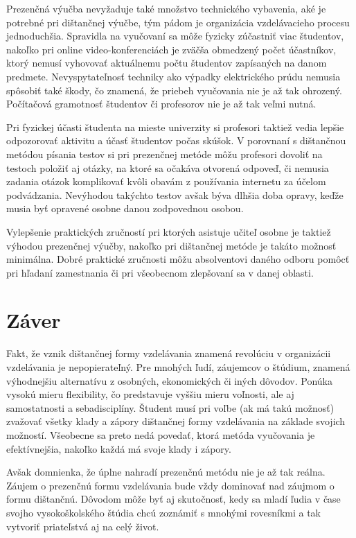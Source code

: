 \documentclass[10pt,twoside,slovak,a4paper]{article}
\begin{document}
	Prezenčná výučba nevyžaduje také množstvo technického vybavenia, aké je potrebné pri dištančnej výučbe, tým pádom je organizácia vzdelávacieho procesu jednoduchšia. Spravidla na vyučovaní sa môže fyzicky zúčastniť viac študentov, nakoľko pri online video-konferenciách je zväčša obmedzený počet účastníkov, ktorý nemusí vyhovovať aktuálnemu počtu študentov zapísaných na danom predmete. Nevyspytateľnosť techniky ako výpadky elektrického prúdu nemusia spôsobiť také škody, čo znamená, že priebeh vyučovania nie je až tak ohrozený. Počítačová gramotnosť študentov či profesorov nie je až tak veľmi nutná.

	Pri fyzickej účasti študenta na mieste univerzity si profesori taktiež vedia lepšie odpozorovať aktivitu a účasť študentov počas skúšok. V porovnaní s dištančnou metódou písania testov si pri prezenčnej metóde môžu profesori dovoliť na testoch položiť aj otázky, na ktoré sa očakáva otvorená odpoveď, či nemusia zadania otázok komplikovať kvôli obavám z používania internetu za účelom podvádzania. Nevýhodou takýchto testov avšak býva dlhšia doba opravy, keďže musia byť opravené osobne danou zodpovednou osobou. 

	Vylepšenie praktických zručností pri ktorých asistuje učiteľ osobne je taktiež výhodou prezenčnej výučby, nakoľko pri dištančnej metóde je takáto možnosť minimálna. Dobré praktické zručnosti môžu absolventovi daného odboru pomôcť pri hľadaní zamestnania či pri všeobecnom zlepšovaní sa v danej oblasti. 

\section{Záver}
	Fakt, že vznik dištančnej formy vzdelávania znamená revolúciu v organizácii vzdelávania je nepopierateľný. Pre mnohých ľudí, záujemcov o štúdium, znamená výhodnejšiu alternatívu z osobných, ekonomických či iných dôvodov. Ponúka vysokú mieru flexibility, čo predstavuje vyššiu mieru voľnosti, ale aj samostatnosti a sebadisciplíny. Študent musí pri voľbe (ak má takú možnosť) zvažovať všetky klady a zápory dištančnej formy vzdelávania na základe svojich možností. Všeobecne sa preto nedá povedať, ktorá metóda vyučovania je efektívnejšia, nakoľko každá má svoje klady i zápory. 

	Avšak domnienka, že úplne nahradí prezenčnú metódu nie je až tak reálna. Záujem o prezenčnú formu vzdelávania bude vždy dominovať nad záujmom o formu dištančnú. Dôvodom môže byť aj skutočnosť, kedy sa mladí ľudia v čase svojho vysokoškolského štúdia chcú zoznámiť s mnohými rovesníkmi a tak vytvoriť priateľstvá aj na celý život. 



\end{document}
